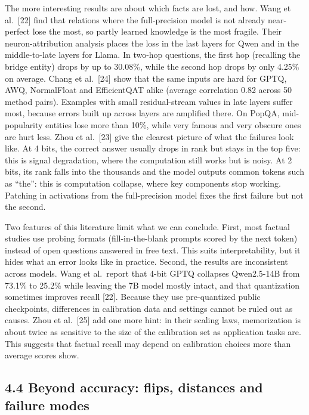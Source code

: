 \documentclass[10pt,twocolumn]{article}
\begin{document}
The more interesting results are about which facts are lost, and how.
Wang et al.~[22] find that relations where the full-precision model is
not already near-perfect lose the most, so partly learned knowledge is
the most fragile. Their neuron-attribution analysis places the loss in
the last layers for Qwen and in the middle-to-late layers for Llama. In
two-hop questions, the first hop (recalling the bridge entity) drops by
up to 30.08\%, while the second hop drops by only 4.25\% on average.
Chang et al.~[24] show that the same inputs are hard for GPTQ, AWQ,
NormalFloat and EfficientQAT alike (average correlation 0.82 across 50
method pairs). Examples with small residual-stream values in late layers
suffer most, because errors built up across layers are amplified there.
On PopQA, mid-popularity entities lose more than 10\%, while very famous
and very obscure ones are hurt less. Zhou et al.~[23] give the clearest
picture of what the failures look like. At 4 bits, the correct answer
usually drops in rank but stays in the top five: this is signal
degradation, where the computation still works but is noisy. At 2 bits,
its rank falls into the thousands and the model outputs common tokens
such as ``the'': this is computation collapse, where key components
stop working. Patching in activations from the full-precision model
fixes the first failure but not the second.

Two features of this literature limit what we can conclude. First, most
factual studies use probing formats (fill-in-the-blank prompts scored by
the next token) instead of open questions answered in free text. This
suits interpretability, but it hides what an error looks like in
practice. Second, the results are inconsistent across models. Wang et
al.~report that 4-bit GPTQ collapses Qwen2.5-14B from 73.1\% to 25.2\%
while leaving the 7B model mostly intact, and that quantization
sometimes improves recall [22]. Because they use pre-quantized public
checkpoints, differences in calibration data and settings cannot be
ruled out as causes. Zhou et al.~[25] add one more hint: in their
scaling laws, memorization is about twice as sensitive to the size of
the calibration set as application tasks are. This suggests that
factual recall may depend on calibration choices more than average
scores show.

\subsection{4.4 Beyond accuracy: flips, distances and failure modes}
\end{document}
